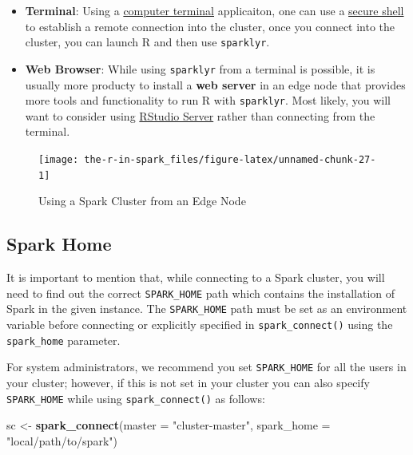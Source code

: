 \documentclass[]{book}
\newenvironment{Shaded}{\begin{snugshade}}{\end{snugshade}}
\newcommand{\DataTypeTok}[1]{\textcolor[rgb]{0.13,0.29,0.53}{#1}}
\newcommand{\KeywordTok}[1]{\textcolor[rgb]{0.13,0.29,0.53}{\textbf{#1}}}
\newcommand{\NormalTok}[1]{#1}
\newcommand{\StringTok}[1]{\textcolor[rgb]{0.31,0.60,0.02}{#1}}
\providecommand{\tightlist}{%
  \setlength{\itemsep}{0pt}\setlength{\parskip}{0pt}}
\theoremstyle{definition}
\theoremstyle{definition}
\theoremstyle{definition}
\theoremstyle{remark}
\begin{document}
\begin{itemize}
\tightlist
\item
  \textbf{Terminal}: Using a
  \href{https://en.wikipedia.org/wiki/Computer_terminal}{computer
  terminal} applicaiton, one can use a
  \href{https://en.wikipedia.org/wiki/Secure_Shell}{secure shell} to
  establish a remote connection into the cluster, once you connect into
  the cluster, you can launch R and then use \texttt{sparklyr}.
\item
  \textbf{Web Browser}: While using \texttt{sparklyr} from a terminal is
  possible, it is usually more producty to install a \textbf{web server}
  in an edge node that provides more tools and functionality to run R
  with \texttt{sparklyr}. Most likely, you will want to consider using
  \href{RStudio\%20Server}{RStudio Server} rather than connecting from
  the terminal.
\end{itemize}

\begin{figure}

{\centering \texttt{[image: the-r-in-spark\_files/figure-latex/unnamed-chunk-27-1]} 

}

\caption{Using a Spark Cluster from an Edge Node}\label{fig:unnamed-chunk-27}
\end{figure}

\hypertarget{spark-home}{%
\subsection{Spark Home}\label{spark-home}}

It is important to mention that, while connecting to a Spark cluster,
you will need to find out the correct \texttt{SPARK\_HOME} path which
contains the installation of Spark in the given instance. The
\texttt{SPARK\_HOME} path must be set as an environment variable before
connecting or explicitly specified in \texttt{spark\_connect()} using
the \texttt{spark\_home} parameter.

For system administrators, we recommend you set \texttt{SPARK\_HOME} for
all the users in your cluster; however, if this is not set in your
cluster you can also specify \texttt{SPARK\_HOME} while using
\texttt{spark\_connect()} as follows:

\begin{Shaded}
\begin{Highlighting}[]
\NormalTok{sc <-}\StringTok{ }\KeywordTok{spark_connect}\NormalTok{(}\DataTypeTok{master =} \StringTok{"cluster-master"}\NormalTok{, }\DataTypeTok{spark_home =} \StringTok{"local/path/to/spark"}\NormalTok{)}
\end{Highlighting}
\end{Shaded}
\end{document}
